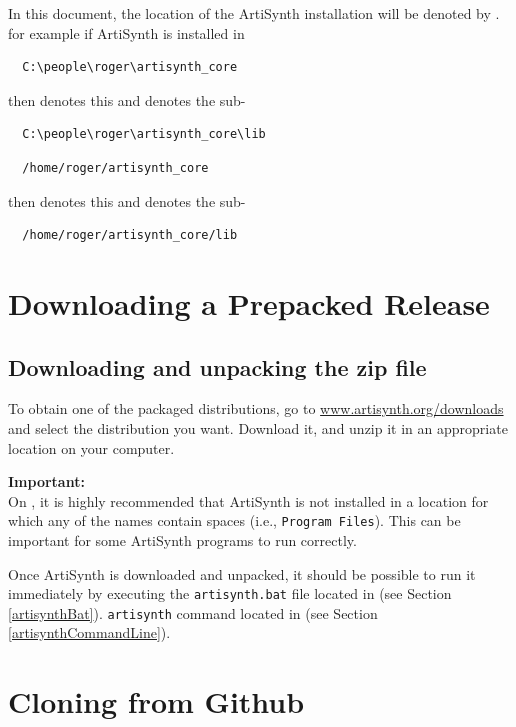 In this document, the location of the ArtiSynth installation \directory{}
will be denoted by \ArtHome[]. for example
if ArtiSynth is installed in
\ifWindows
\begin{verbatim}
  C:\people\roger\artisynth_core
\end{verbatim}
then \ArtHome[] denotes this \directory{}
and  denotes the sub-\directory{}
\begin{verbatim}
  C:\people\roger\artisynth_core\lib
\end{verbatim}
\else
\begin{verbatim}
  /home/roger/artisynth_core
\end{verbatim}
then \ArtHome[] denotes this \directory{}
and  denotes the sub-\directory{}
\begin{verbatim}
  /home/roger/artisynth_core/lib
\end{verbatim}
\fi

\section{Downloading a Prepacked Release}
\label{PrepackagedRelease}

\subsection{Downloading and unpacking the zip file}

To obtain one of the packaged distributions, go to
\href{http://www.artisynth.org/downloads}%
{www.artisynth.org/downloads}
and select the distribution
you want. Download it, and unzip it in an appropriate location on your
computer.

\ifWindows
\begin{sideblock}
{\bf Important:}\\
On \SYSTEM{}, it is highly recommended that ArtiSynth is not installed
in a location for which any of the \directory{} names contain spaces (i.e.,
{\tt Program Files}).  This can be important for some ArtiSynth
programs to run correctly.
\end{sideblock}
\else\fi

Once ArtiSynth is downloaded and unpacked, it should be possible to
run it immediately by executing the
\ifWindows
{\tt artisynth.bat} file located in 
(see Section \ref{artisynthBat}).
\else
{\tt artisynth} command located in 
(see Section \ref{artisynthCommandLine}).
\fi

\section{Cloning from Github}
\label{GitClone}

